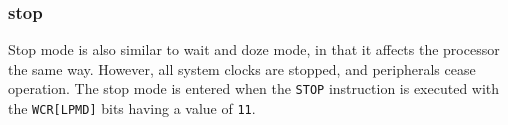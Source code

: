 \subsubsection{stop}
Stop mode is also similar to wait and doze mode, in that it affects the
processor the same way. However, all system clocks are stopped, and peripherals
cease operation.
The stop mode is entered when the \texttt{STOP} instruction is executed with the
\texttt{WCR[LPMD]} bits having a value of \texttt{11}.

